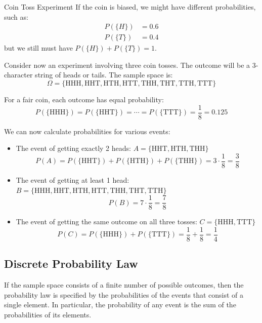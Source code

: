\begin{itemize}
\begin{exampleboxbreak}{Coin Toss Experiment}
If the coin is biased, we might have different probabilities, such as:
\begin{align}
P(\{H\}) &= 0.6\\
P(\{T\}) &= 0.4
\end{align}
but we still must have $P(\{H\}) + P(\{T\}) = 1$. 


Consider now an experiment involving three coin tosses. The outcome will be a 3-character string of heads or tails. The sample space is:
\[\Omega = \{\text{HHH}, \text{HHT}, \text{HTH}, \text{HTT}, \text{THH}, \text{THT}, \text{TTH}, \text{TTT}\}\]

For a fair coin, each outcome has equal probability:
\[P(\{\text{HHH}\}) = P(\{\text{HHT}\}) = \cdots = P(\{\text{TTT}\}) = \frac{1}{8} = 0.125\]

We can now calculate probabilities for various events:
\begin{itemize}
    \item The event of getting exactly 2 heads: $A = \{\text{HHT}, \text{HTH}, \text{THH}\}$
    \[P(A) = P(\{\text{HHT}\}) + P(\{\text{HTH}\}) + P(\{\text{THH}\}) = 3 \cdot \frac{1}{8} = \frac{3}{8}\]
    
    \item The event of getting at least 1 head: $B = \{\text{HHH}, \text{HHT}, \text{HTH}, \text{HTT}, \text{THH}, \text{THT}, \text{TTH}\}$
    \[P(B) = 7 \cdot \frac{1}{8} = \frac{7}{8}\]
    
    \item The event of getting the same outcome on all three tosses: $C = \{\text{HHH}, \text{TTT}\}$
    \[P(C) = P(\{\text{HHH}\}) + P(\{\text{TTT}\}) = \frac{1}{8} + \frac{1}{8} = \frac{1}{4}\]
\end{itemize}

\end{exampleboxbreak}


\subsection{Discrete Probability Law}

If the sample space consists of a finite number of possible outcomes, then the probability law is specified by the probabilities of the events that consist of a single element. In particular, the probability of any event is the sum of the probabilities of its elements.


\end{itemize}
